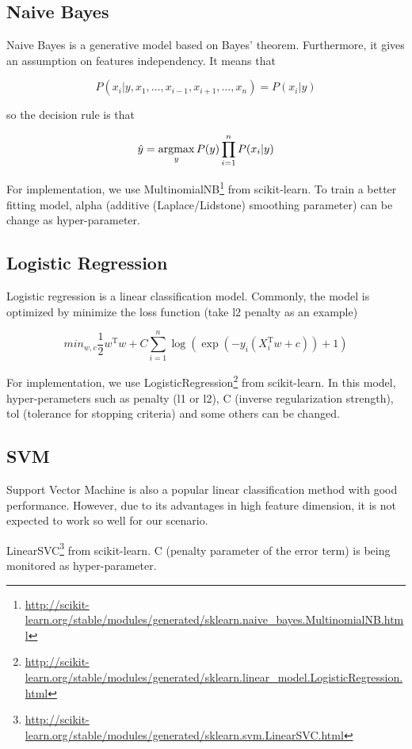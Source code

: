\documentclass{article}
\begin{document}
\subsection{Naive Bayes}

Naive Bayes is a generative model based on Bayes’ theorem. Furthermore, it gives an assumption on features independency. It means that

$$
P(x_i|y,x_1,\dots,x_{i-1},x_{i+1},\dots,x_n)=P(x_i|y)
$$

so the decision rule is that

\newcommand{\argmax}{\operatornamewithlimits{argmax}}
$$
\hat{y}=\argmax_yP(y)\prod_{i=1}^nP(x_i|y)
$$

For implementation, we use MultinomialNB\footnote{\url{http://scikit-learn.org/stable/modules/generated/sklearn.naive_bayes.MultinomialNB.html}} from scikit-learn. To train a better fitting model, alpha (additive (Laplace/Lidstone) smoothing parameter) can be change as hyper-parameter.

\subsection{Logistic Regression}

Logistic regression is a linear classification model. Commonly, the model is optimized by minimize the loss function (take l2 penalty as an example)

$$
min_{w,c}\frac{1}{2}w^\mathrm{T}w+C\sum_{i=1}^n\log(\exp(-y_i(X_i^\mathrm{T}w+c))+1)
$$

For implementation, we use LogisticRegression\footnote{\url{http://scikit-learn.org/stable/modules/generated/sklearn.linear_model.LogisticRegression.html}} from scikit-learn. In this model, hyper-perameters such as penalty (l1 or l2), C (inverse regularization strength), tol (tolerance for stopping criteria) and some others can be changed.

\subsection{SVM}

Support Vector Machine is also a popular linear classification method with good performance. However, due to its advantages in high feature dimension, it is not expected to work so well for our scenario.

LinearSVC\footnote{\url{http://scikit-learn.org/stable/modules/generated/sklearn.svm.LinearSVC.html}} from scikit-learn. C (penalty parameter of the error term) is being monitored as hyper-parameter.
\end{document}
